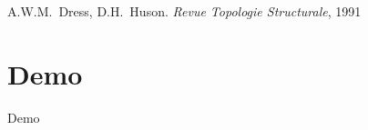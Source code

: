 \documentclass{beamer}
\begin{document}
\begin{frame}
  \begin{center}
    {\small
      A.W.M.\ Dress, D.H.\ Huson. {\it Revue Topologie Structurale}, 1991
    }
  \end{center}
\end{frame}


\section{Demo}

\begin{frame}
  \begin{center}
    Demo
  \end{center}
\end{frame}
\end{document}
